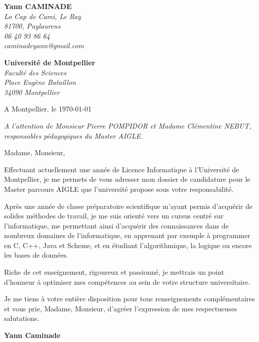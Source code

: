 \documentclass[11pt]{letter}
\begin{document}
\sffamily
\hfill
%
\begin{flushleft}
{\bfseries Yann CAMINADE}\\%
\small\itshape
Lo Cap de Cami, Le Ray\\
81700, Puylaurens\\%
06 40 93 86 64\\
caminadeyann@gmail.com
\end{flushleft}
%
\begin{flushright}
{\bfseries Université de Montpellier}\\
\small\itshape
Faculté des Sciences\\
Place Eugène Bataillon\\
34090 Montpellier\\
\end{flushright}
%
\hfill
%
\begin{flushright}
A Montpellier, le \today \\
\end{flushright}
 
\textit{A l’attention de Monsieur Pierre POMPIDOR et Madame Clémentine NEBUT, responsables pédagogiques du Master AIGLE.}
 
Madame, Monsieur,
 
Effectuant actuellement une année de Licence Informatique à l'Université de Montpellier, je me permets de vous adresser mon dossier de candidature pour le Master parcours AIGLE que l'université propose sous votre responsabilité.

Après une année de classe préparatoire scientifique m'ayant permis d'acquérir de solides méthodes de travail, je me suis orienté vers un cursus centré sur l'informatique, me permettant ainsi d'acquérir des connaissances dans de nombreux domaines de l'informatique, en apprenant par exemple à programmer en C, C++, Java et Scheme, et en étudiant l'algorithmique, la logique ou encore les bases de données.

Riche de cet enseignement, rigoureux et passionné, je mettrais un point d'honneur à optimiser mes compétences au sein de votre structure universitaire.

Je me tiens à votre entière disposition pour tous renseignements complémentaires et vous prie, Madame, Monsieur, d'agréer l'expression de mes respectueuses salutations.

 \begin{flushright}
 {\bfseries Yann Caminade}\\
 \hspace{5cm}
 \end{flushright}
 \vfill
 
\end{document}
